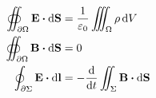 \begin{subequations}
\begin{align}
    \oiint_{\partial\Omega} \vb{E} \vdot \dd{\vb{S}} &= \frac{1}{\varepsilon_0} \iiint_\Omega \rho \dd{V} \\
    \oiint_{\partial\Omega} \vb{B} \vdot \dd{\vb{S}} &= 0 \\
    \oint_{\partial \Sigma} \vb{E} \vdot \dd{\vb{l}} &= -\dv{t} \iint_\Sigma \vb{B} \vdot \dd{\vb{S}}
\end{align}
\end{subequations}